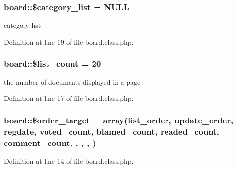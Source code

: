 \subsubsection[{\$category\+\_\+list}]{\setlength{\rightskip}{0pt plus 5cm}board\+::\$category\+\_\+list = N\+U\+L\+L}\label{classboard_aee8ebe65314796fea517f8f7875a4b8f}


category list 



Definition at line 19 of file board.\+class.\+php.

\hypertarget{classboard_ab66c6932a082c110ebd921c0be8d6788}{}
\subsubsection[{\$list\+\_\+count}]{\setlength{\rightskip}{0pt plus 5cm}board\+::\$list\+\_\+count = 20}\label{classboard_ab66c6932a082c110ebd921c0be8d6788}


the number of documents displayed in a page 



Definition at line 17 of file board.\+class.\+php.

\hypertarget{classboard_a66d1965fe6a51e8143499adeaf3998cc}{}
\subsubsection[{\$order\+\_\+target}]{\setlength{\rightskip}{0pt plus 5cm}board\+::\$order\+\_\+target = array(\textquotesingle{}list\+\_\+order\textquotesingle{}, \textquotesingle{}update\+\_\+order\textquotesingle{}, \textquotesingle{}regdate\textquotesingle{}, \textquotesingle{}voted\+\_\+count\textquotesingle{}, \textquotesingle{}blamed\+\_\+count\textquotesingle{}, \textquotesingle{}readed\+\_\+count\textquotesingle{}, \textquotesingle{}comment\+\_\+count\textquotesingle{}, \textquotesingle{}, \textquotesingle{}, \textquotesingle{}, \textquotesingle{})}\label{classboard_a66d1965fe6a51e8143499adeaf3998cc}


Definition at line 14 of file board.\+class.\+php.

\hypertarget{classboard_ab5d2d3925f753039483da2c65076122b}{}
